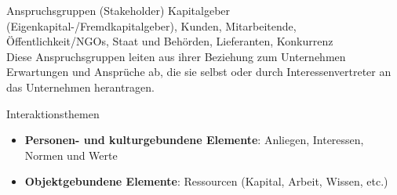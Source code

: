 \begin{corollary}{Anspruchsgruppen (Stakeholder)}
    Kapitalgeber (Eigenkapital-/Fremdkapitalgeber), Kunden, Mitarbeitende, Öffentlichkeit/NGOs, Staat und Behörden, Lieferanten, Konkurrenz
\vspace{1mm}\\
Diese Anspruchsgruppen leiten aus ihrer Beziehung zum Unternehmen Erwartungen und Ansprüche ab, die sie selbst oder durch Interessenvertreter an das Unternehmen herantragen.
\end{corollary}


\begin{corollary}{Interaktionsthemen}
\begin{itemize}
    \item \textbf{Personen- und kulturgebundene Elemente}: Anliegen, Interessen, Normen und Werte
    \item \textbf{Objektgebundene Elemente}: Ressourcen (Kapital, Arbeit, Wissen, etc.)
\end{itemize}
\end{corollary}

